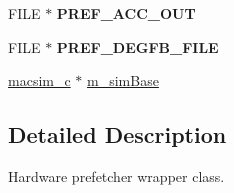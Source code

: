 \begin{DoxyCompactItemize}
\item 
\hypertarget{classhwp__common__c_aaf382398b2bb37046699f31dd4eec5b8}{
FILE $\ast$ {\bfseries PREF\_\-ACC\_\-OUT}}
\label{classhwp__common__c_aaf382398b2bb37046699f31dd4eec5b8}

\item 
\hypertarget{classhwp__common__c_ade3339cc823e103bc6fd2b4985d26099}{
FILE $\ast$ {\bfseries PREF\_\-DEGFB\_\-FILE}}
\label{classhwp__common__c_ade3339cc823e103bc6fd2b4985d26099}

\item 
\hyperlink{classmacsim__c}{macsim\_\-c} $\ast$ \hyperlink{classhwp__common__c_aea3fc85931e5d425eb8c7a60f39aa7fe}{m\_\-simBase}
\end{DoxyCompactItemize}


\subsection{Detailed Description}
Hardware prefetcher wrapper class. 

